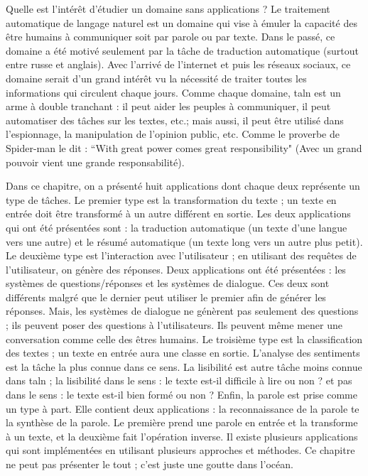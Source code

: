 \documentclass{KodeBook}
\begin{document}
\begin{discussion}
Quelle est l'intérêt d'étudier un domaine sans applications ? 
Le traitement automatique de langage naturel est un domaine qui vise à émuler la capacité des être humains à communiquer soit par parole ou par texte. 
Dans le passé, ce domaine a été motivé seulement par la tâche de traduction automatique (surtout entre russe et anglais). 
Avec l'arrivé de l'internet et puis les réseaux sociaux, ce domaine serait d'un grand intérêt vu la nécessité de traiter toutes les informations qui circulent chaque jours. 
Comme chaque domaine, \ac{taln} est un arme à double tranchant : il peut aider les peuples à communiquer, il peut automatiser des tâches sur les textes, etc.; mais aussi, il peut être utilisé dans l'espionnage, la manipulation de l'opinion public, etc. 
Comme le proverbe de Spider-man le dit : ``With great power comes great responsibility" (Avec un grand pouvoir vient une grande responsabilité). 

Dans ce chapitre, on a présenté huit applications dont chaque deux représente un type de tâches. 
Le premier type est la transformation du texte ; un texte en entrée doit être transformé à un autre différent en sortie. 
Les deux applications qui ont été présentées sont : la traduction automatique (un texte d'une langue vers une autre) et le résumé automatique (un texte long vers un autre plus petit). 
Le deuxième type est l'interaction avec l'utilisateur ; en utilisant des requêtes de l'utilisateur, on génère des réponses. 
Deux applications ont été présentées : les systèmes de questions/réponses et les systèmes de dialogue.
Ces deux sont différents malgré que le dernier peut utiliser le premier afin de générer les réponses. 
Mais, les systèmes de dialogue ne génèrent pas seulement des questions ; ils peuvent poser des questions à l'utilisateurs.
Ils peuvent même mener une conversation comme celle des êtres humains. 
Le troisième type est la classification des textes ; un texte en entrée aura une classe en sortie. 
L'analyse des sentiments est la tâche la plus connue dans ce sens.
La lisibilité est autre tâche moins connue dans \ac{taln} ; la lisibilité dans le sens : le texte est-il difficile à lire ou non ? et pas dans le sens : le texte est-il bien formé ou non ?
Enfin, la parole est prise comme un type à part. 
Elle contient deux applications : la reconnaissance de la parole te la synthèse de la parole. 
Le première prend une parole en entrée et la transforme à un texte, et la deuxième fait l'opération inverse.
Il existe plusieurs applications qui sont implémentées en utilisant plusieurs approches et méthodes. 
Ce chapitre ne peut pas présenter le tout ; c'est juste une goutte dans l'océan.
\end{discussion}

\ifx\wholebook\relax\else
% 
% 
	
\end{document}
